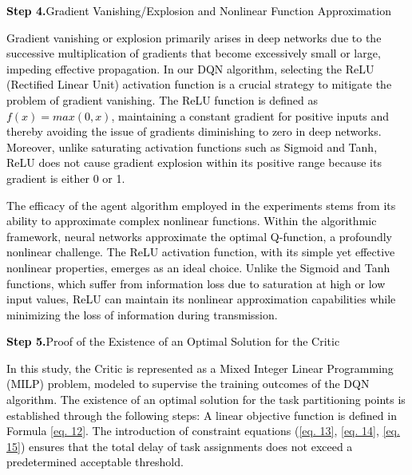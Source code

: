 \documentclass[preprint,12pt]{elsarticle}
\begin{document}
\textcolor{black}{\textbf{Step 4.}Gradient Vanishing/Explosion and Nonlinear Function Approximation}

\textcolor{black}{Gradient vanishing or explosion primarily arises in deep networks due to the successive multiplication of gradients that become excessively small or large, impeding effective propagation. In our DQN algorithm, selecting the ReLU (Rectified Linear Unit) activation function is a crucial strategy to mitigate the problem of gradient vanishing. The ReLU function is defined as \(f(x) = max(0, x)\), maintaining a constant gradient for positive inputs and thereby avoiding the issue of gradients diminishing to zero in deep networks. Moreover, unlike saturating activation functions such as Sigmoid and Tanh, ReLU does not cause gradient explosion within its positive range because its gradient is either 0 or 1.}

\textcolor{black}{The efficacy of the agent algorithm employed in the experiments stems from its ability to approximate complex nonlinear functions. Within the algorithmic framework, neural networks approximate the optimal Q-function, a profoundly nonlinear challenge. The ReLU activation function, with its simple yet effective nonlinear properties, emerges as an ideal choice. Unlike the Sigmoid and Tanh functions, which suffer from information loss due to saturation at high or low input values, ReLU can maintain its nonlinear approximation capabilities while minimizing the loss of information during transmission.}

\textcolor{black}{\textbf{Step 5.}Proof of the Existence of an Optimal Solution for the Critic}

\textcolor{black}{In this study, the Critic is represented as a Mixed Integer Linear Programming (MILP) problem, modeled to supervise the training outcomes of the DQN algorithm. The existence of an optimal solution for the task partitioning points is established through the following steps: A linear objective function is defined in Formula \ref{eq. 12}. The introduction of constraint equations (\ref{eq. 13}, \ref{eq. 14}, \ref{eq. 15}) ensures that the total delay of task assignments does not exceed a predetermined acceptable threshold.}
\end{document}
